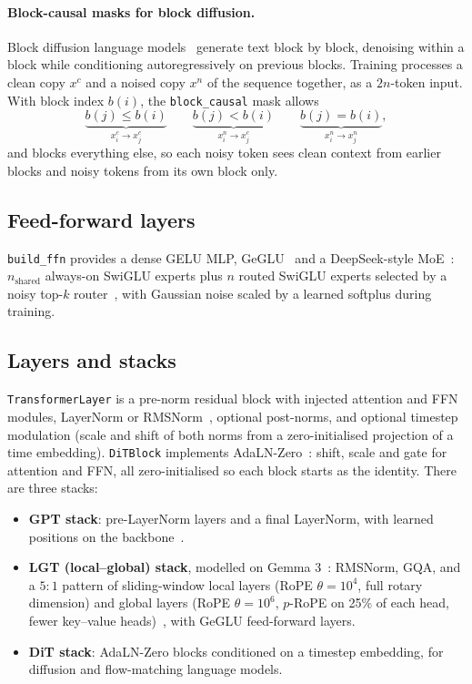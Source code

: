 \documentclass[11pt]{article}
\begin{document}
\paragraph{Block-causal masks for block diffusion.} Block diffusion language
models~\cite{arriola2025bd3lm} generate text block by block, denoising within a block while
conditioning autoregressively on previous blocks. Training processes a clean copy
$x^{c}$ and a noised copy $x^{n}$ of the sequence together, as a $2n$-token input. With
block index $b(i)$, the \texttt{block\_causal} mask allows
\begin{equation}
  \underbrace{b(j)\le b(i)}_{x^c_i \to x^c_j} \qquad
  \underbrace{b(j)< b(i)}_{x^n_i \to x^c_j} \qquad
  \underbrace{b(j)= b(i)}_{x^n_i \to x^n_j},
\end{equation}
and blocks everything else, so each noisy token sees clean context from earlier blocks and
noisy tokens from its own block only.

\subsection{Feed-forward layers}

\texttt{build\_ffn} provides a dense GELU MLP, GeGLU~\cite{shazeer2020glu} and a DeepSeek-style
MoE~\cite{dai2024deepseekmoe}: $n_{\text{shared}}$ always-on SwiGLU experts plus $n$ routed
SwiGLU experts selected by a noisy top-$k$ router~\cite{shazeer2017outrageously}, with
Gaussian noise scaled by a learned softplus during training.

\subsection{Layers and stacks}

\texttt{TransformerLayer} is a pre-norm residual block with injected attention and FFN
modules, LayerNorm or RMSNorm~\cite{zhang2019rmsnorm}, optional post-norms, and optional
timestep modulation (scale and shift of both norms from a zero-initialised projection of a
time embedding). \texttt{DiTBlock} implements AdaLN-Zero~\cite{peebles2023dit}: shift, scale and
gate for attention and FFN, all zero-initialised so each block starts as the identity.
There are three stacks:
\begin{itemize}
  \item \textbf{GPT stack}: pre-LayerNorm layers and a final LayerNorm, with learned
        positions on the backbone~\cite{radford2019gpt2}.
  \item \textbf{LGT (local--global) stack}, modelled on Gemma 3~\cite{gemma3}: RMSNorm, GQA,
        and a $5{:}1$ pattern of sliding-window local layers (RoPE $\theta=10^4$, full
        rotary dimension) and global layers (RoPE $\theta=10^6$, $p$-RoPE on 25\% of each
        head, fewer key--value heads)~\cite{beltagy2020longformer,barbero2024prope}, with
        GeGLU feed-forward layers.
  \item \textbf{DiT stack}: AdaLN-Zero blocks conditioned on a timestep embedding, for
        diffusion and flow-matching language models.
\end{itemize}
\end{document}
